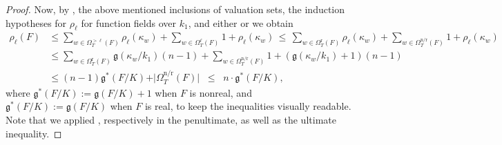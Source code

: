 \documentclass[a4paper,12pt,reqno]{amsart}
\theoremstyle{definition}
\numberwithin{equation}{thm}
\renewcommand{\leq}{\leqslant}
\renewcommand{\geq}{\geqslant}
\begin{document}
\begin{proof}
 Now, by , the above mentioned inclusions of valuation sets, the induction hypotheses for $\rho_\ell$ for function fields over $k_1$, and either  or  we obtain   
\begin{align*} \rho_{\ell}(F) &\leq \sum_{w\in\Omega_T^{> \ell}(F)}\!\!\rho_{\ell}(\kappa_{w})+\!\!\!\!\!\sum_{w\in\Omega^{\ell}_T(F)} \!\!1+\rho_{\ell}(\kappa_{w}) \, \leq \, \sum_{w\in\Omega_T^{\text{r}}(F)} \rho_{\ell}(\kappa_{w}) + \sum_{w\in\Omega_T^{\text{n/r}}(F)} 1+ \rho_{\ell}(\kappa_{w}) \\ 
&\leq \sum_{w\in\Omega_T^{\text{r}}(F)} \mathfrak{g}(\kappa_{w}/k_1)(n-1) +\sum_{w\in\Omega_T^{\text{n/r}}(F)} 1 +  (\mathfrak{g}(\kappa_{w}/k_1)+1)(n-1) \\ &\leq (n-1) \mathfrak{g}^{*}(F/K)  + \vert \Omega_T^{\text{n/r}}(F) \vert \;\; \leq \;\; n\cdot \mathfrak{g}^{*}(F/K),
\end{align*} 
where $\mathfrak{g}^{*}(F/K):= \mathfrak{g}(F/K)+ 1$ when $F$ is nonreal, and $\mathfrak{g}^{*}(F/K):= \mathfrak{g}(F/K)$ when $F$ is real, to  keep the inequalities visually readable. Note that we applied , respectively  in the penultimate, as well as the ultimate inequality. 
\end{proof}
\end{document}
